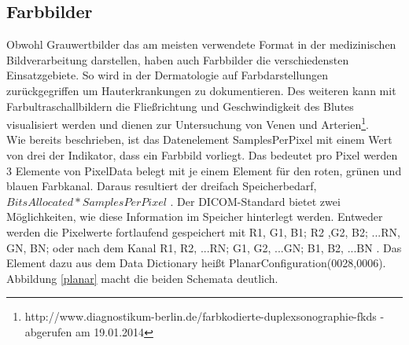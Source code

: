 \subsection{Farbbilder} \label{color_images}
Obwohl Grauwertbilder das am meisten verwendete Format in der medizinischen Bildverarbeitung darstellen, haben auch Farbbilder die verschiedensten Einsatzgebiete. So wird in der Dermatologie auf Farbdarstellungen zurückgegriffen um Hauterkrankungen zu dokumentieren\cite[2.2.3.2]{handels:mbv}. Des weiteren kann mit Farbultraschallbildern die Fließrichtung und Geschwindigkeit des Blutes visualisiert werden und dienen zur Untersuchung von Venen und Arterien\footnote{http://www.diagnostikum-berlin.de/farbkodierte-duplexsonographie-fkds - abgerufen am 19.01.2014}.\\
Wie bereits beschrieben, ist das Datenelement SamplesPerPixel mit einem Wert von drei der Indikator, dass ein Farbbild vorliegt. Das bedeutet pro Pixel werden 3 Elemente von PixelData belegt mit je einem Element für den roten, grünen und blauen Farbkanal. Daraus resultiert der dreifach Speicherbedarf, $BitsAllocated * SamplesPerPixel$ \cite[C.7.6.3.1.1]{dicom:iod}. Der DICOM-Standard bietet zwei Möglichkeiten, wie diese Information im Speicher hinterlegt werden. Entweder werden die Pixelwerte fortlaufend gespeichert mit R1, G1, B1; R2 ,G2, B2; ...RN, GN, BN; oder nach dem Kanal R1, R2, ...RN; G1, G2, ...GN; B1, B2, ...BN \cite[C.7.6.3.1.3]{dicom:iod}. Das Element dazu aus dem Data Dictionary heißt PlanarConfiguration(0028,0006). Abbildung \ref{planar} macht die beiden Schemata deutlich.

